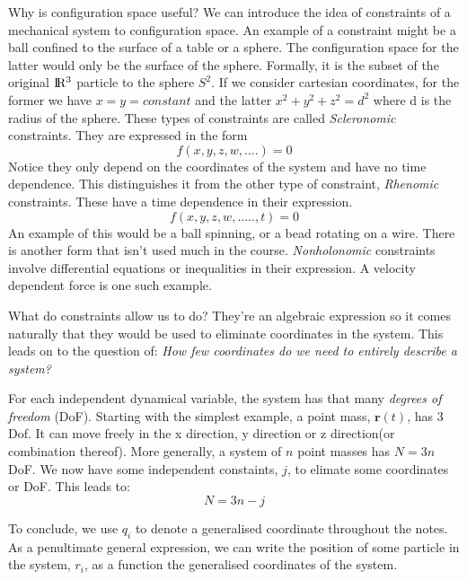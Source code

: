 Why is configuration space useful? We can introduce the idea of constraints of a mechanical system to configuration space. An example of a constraint might be a ball confined to the surface of a table or a sphere. The configuration space for the latter would only be the surface of the sphere. Formally, it is the subset of the original $\rm I\!R^{3}$ particle to the sphere $S^{2}$. If we consider cartesian coordinates, for the former we have $x=y=constant$ and the latter $x^{2} + y^{2} + z^{2} = d^{2}$ where d is the radius of the sphere. These types of constraints are called \textit{Scleronomic} constraints. They are expressed in the form
\begin{equation}
f(x , y, z, w,....) = 0 
\end{equation}
Notice they only depend on the coordinates of the system and have no time dependence. This distinguishes it from the other type of constraint, \textit{Rhenomic} constraints. These have a time dependence in their expression.
\begin{equation}
f(x, y, z, w,....., t) = 0   
\end{equation}
An example of this would be a ball spinning, or a bead rotating on a wire. There is another form that isn't used much in the course. \textit{Nonholonomic} constraints involve differential equations or inequalities in their expression. A velocity dependent force is one such example. \par
What do constraints allow us to do? They're an algebraic expression so it comes naturally that they would be used to eliminate coordinates in the system. This leads on to the question of: \textit{How few coordinates do we need to entirely describe a system?}\par
For each independent dynamical variable, the system has that many \textit{degrees of freedom} (DoF). Starting with the simplest example, a point mass, $\textbf{r}(t)$, has 3 Dof. It can move freely in the x direction, y direction or z direction(or combination thereof). More generally, a system of $n$ point masses has $N = 3n$ DoF. We now have some independent constaints, $j$, to elimate some coordinates or DoF. This leads to:
\begin{equation}
N = 3n - j 
\end{equation}
\par To conclude, we use $q_{i}$ to denote a generalised coordinate throughout the notes. As a penultimate general expression, we can write the position of some particle in the system, $r_{i}$, as a function the generalised coordinates of the system.
